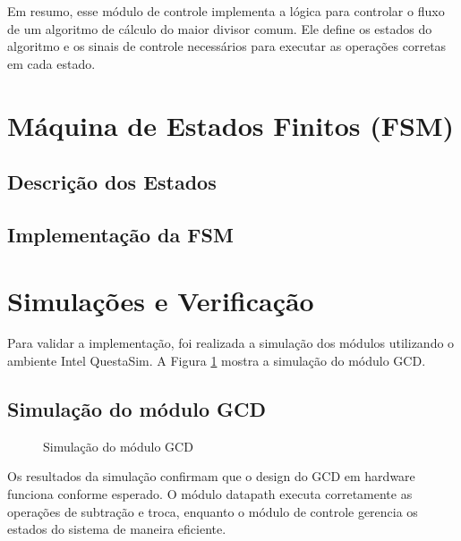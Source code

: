 \documentclass[a4paper,11pt]{article} %
\begin{document}
Em resumo, esse módulo de controle implementa a lógica para controlar o fluxo de um algoritmo de cálculo do maior divisor comum. Ele define os estados do algoritmo e os sinais de controle necessários para executar as operações corretas em cada estado.

\section{Máquina de Estados Finitos (FSM)}

\subsection{Descrição dos Estados}

\subsection{Implementação da FSM}

\section{Simulações e Verificação}

Para validar a implementação, foi realizada a simulação dos módulos utilizando o ambiente Intel QuestaSim. A Figura \ref{fig:simulacao} mostra a simulação do módulo GCD.

\subsection{Simulação do módulo GCD}
\begin{figure}[ht]
\centering
\caption{Simulação do módulo GCD}
\label{fig:simulacao}
\end{figure}

Os resultados da simulação confirmam que o design do GCD em hardware funciona conforme esperado. O módulo datapath executa corretamente as operações de subtração e troca, enquanto o módulo de controle gerencia os estados do sistema de maneira eficiente.
\end{document}
